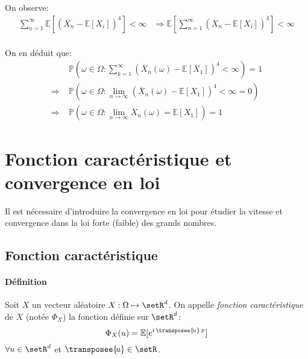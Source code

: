 \documentclass[a4paper,10pt,french,openany]{memoir}
\newcommand{\Proba}{\mathbb{P}}
\newcommand{\Esper}{\mathbb{E}}
\newcommand{\implique}{\Rightarrow}
\begin{document}
On observe:
\begin{align*}
 \sum_{n=1}^\infty \Esper\left[(\overline X_n - \Esper[X_i])^4\right] < \infty &\implique \Esper\left[\sum_{n=1}^\infty (\overline X_n - \Esper[X_i])^4\right] < \infty \\
\end{align*}

On en déduit que:
\begin{align*}
 &\Proba(\omega \in \Omega: \sum_{k=1}^\infty (\overline X_n(\omega) - \Esper[X_1])^4 < \infty) = 1 \\
 \implique\;& \Proba(\omega \in \Omega: \lim_{n\to\infty} (\overline X_n(\omega) - \Esper[X_1])^4 < \infty = 0)\\
 \implique\;& \Proba(\omega \in \Omega: \lim_{n\to\infty} \overline X_n(\omega) = \Esper[X_1]) = 1
\end{align*}

\section{Fonction caractéristique et convergence en loi}

Il est nécessaire d'introduire la convergence en loi pour étudier la vitesse et convergence dans la loi forte (faible) des grands nombres.

\subsection{Fonction caractéristique}

\paragraph{Définition}
Soit $X$ un vecteur aléatoire $X:\Omega\mapsto\setR^d$. On appelle \emph{fonction caractéristique} de $X$ (notée $\Phi_X$) la fonction définie sur $\setR^d$:
\[ \Phi_X (u) = \Esper[e^{i\, \transposee{\!u}\, x}] \]
$\forall u \in \setR^d$ et $\transposee{\!u}\in\setR$.
\end{document}
